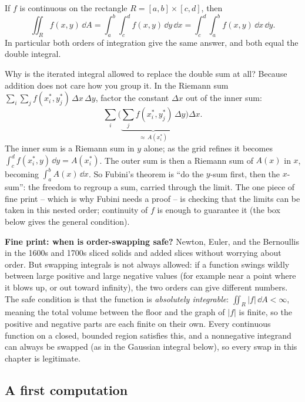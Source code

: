 \begin{theorem}
\label{ch34:thm-fubini}
If $f$ is continuous on the rectangle $R=[a,b]\times[c,d]$, then
\[
  \iint_R f(x,y)\,\dd A
  =\int_a^b\!\int_c^d f(x,y)\,\dd y\,\dd x
  =\int_c^d\!\int_a^b f(x,y)\,\dd x\,\dd y .
\]
In particular both orders of integration give the same answer, and both equal the
double integral.
\end{theorem}

\begin{whybox}
Why is the iterated integral allowed to replace the double sum at all? Because
addition does not care how you group it. In the Riemann sum
$\sum_i\sum_j f(x_i^\ast,y_j^\ast)\,\Delta x\,\Delta y$, factor the constant
$\Delta x$ out of the inner sum:
\[
  \sum_i\Big(\underbrace{\sum_j f(x_i^\ast,y_j^\ast)\,\Delta y}_{\approx\,A(x_i^\ast)}\Big)\Delta x .
\]
The inner sum is a Riemann sum in $y$ alone; as the grid refines it becomes
$\int_c^d f(x_i^\ast,y)\,\dd y=A(x_i^\ast)$. The outer sum is then a Riemann sum
of $A(x)$ in $x$, becoming $\int_a^b A(x)\,\dd x$. So Fubini's theorem is
``do the $y$-sum first, then the $x$-sum'': the freedom to regroup a sum, carried
through the limit. The one piece of fine print -- which is why Fubini needs a
proof -- is checking that the limits can be taken in this nested order;
continuity of $f$ is enough to guarantee it (the box below gives the general
condition).
\end{whybox}

\begin{connectionbox}
\textbf{Fine print: when is order-swapping safe?}
Newton, Euler, and the Bernoullis in the 1600s and 1700s sliced solids and added
slices without worrying about order. But swapping integrals is not always
allowed: if a function swings wildly between large positive and large negative
values (for example near a point where it blows up, or out toward infinity), the
two orders can give different numbers. The safe condition is that the function
is \emph{absolutely integrable}: $\iint_R |f|\,\dd A < \infty$, meaning the total
volume between the floor and the graph of $|f|$ is finite, so the positive and
negative parts are each finite on their own. Every continuous function on a
closed, bounded region satisfies this, and a nonnegative integrand can always be
swapped (as in the Gaussian integral below), so every swap in this chapter is
legitimate.
\end{connectionbox}

\subsection{A first computation}

